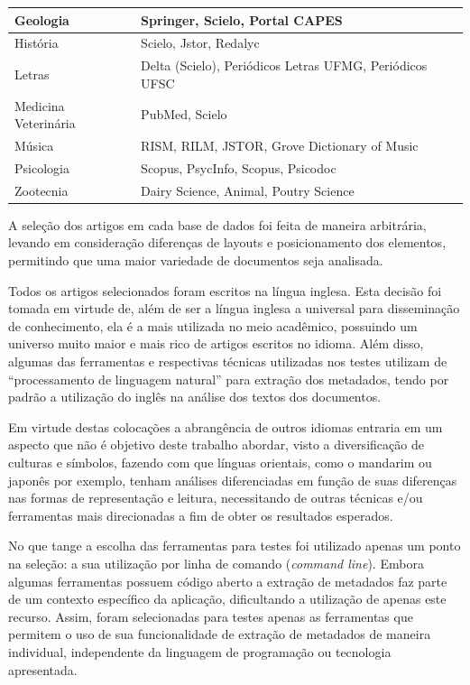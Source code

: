 \begin{table}
\begin{center}
\begin{tabular}{|p{6cm}|p{8cm}|}
            Geologia & Springer, Scielo, Portal CAPES \\
            \hline
            História & Scielo, Jstor, Redalyc \\
            \hline
            Letras & Delta (Scielo), Periódicos Letras UFMG, Periódicos UFSC \\
            \hline
            Medicina Veterinária & PubMed, Scielo \\
            \hline
            Música & RISM, RILM, JSTOR, Grove Dictionary of Music \\
            \hline
            Psicologia & Scopus, PsycInfo, Scopus, Psicodoc \\
            \hline
            Zootecnia & Dairy Science, Animal, Poutry Science \\
            \hline
        \end{tabular}
    \end{center}
    \label{tab:databases}
\end{table}

A seleção dos artigos em cada base de dados foi feita de maneira arbitrária, levando em consideração diferenças de layouts e posicionamento dos elementos, permitindo que uma maior variedade de documentos seja analisada.


Todos os artigos selecionados foram escritos na língua inglesa. Esta decisão foi tomada em virtude de, além de ser a língua inglesa a universal para disseminação de conhecimento, ela é a mais utilizada no meio acadêmico, possuindo um universo muito maior e mais rico de artigos escritos no idioma. Além disso, algumas das ferramentas e respectivas técnicas utilizadas nos testes utilizam de ``processamento de linguagem natural'' para extração dos metadados, tendo por padrão a utilização do inglês na análise dos textos dos documentos.

Em virtude destas colocações a abrangência de outros idiomas entraria em um aspecto que não é objetivo deste trabalho abordar, visto a diversificação de culturas e símbolos, fazendo com que línguas orientais, como o mandarim ou japonês por exemplo, tenham análises diferenciadas em função de suas diferenças nas formas de representação e leitura, necessitando de outras técnicas e/ou ferramentas mais direcionadas a fim de obter os resultados esperados.

No que tange a escolha das ferramentas para testes foi utilizado apenas um ponto na seleção: a sua utilização por linha de comando (\emph{command line}). Embora algumas ferramentas possuem código aberto a extração de metadados faz parte de um contexto específico da aplicação, dificultando a utilização de apenas este recurso. Assim, foram selecionadas para testes apenas as ferramentas que permitem o uso de sua funcionalidade de extração de metadados de maneira individual, independente da linguagem de programação ou tecnologia apresentada. 

